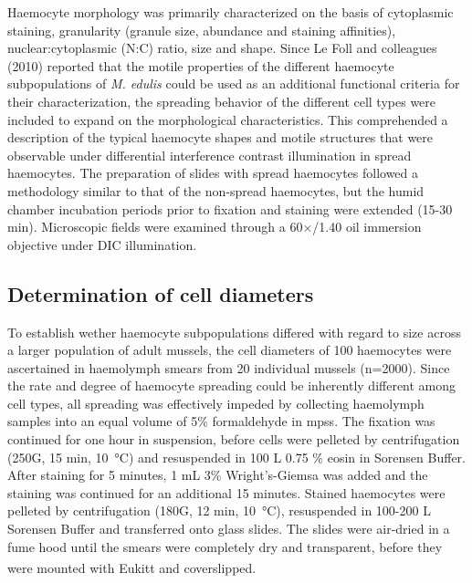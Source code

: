 Haemocyte morphology was primarily characterized on the basis of cytoplasmic staining, granularity (granule size, abundance and staining affinities), nuclear:cytoplasmic (N:C) ratio, size and shape. Since Le Foll and colleagues (2010) reported that the motile properties of the different haemocyte subpopulations of \emph{M. edulis} could be used as an additional functional criteria for their characterization, the spreading behavior of the different cell types were included to expand on the morphological characteristics. This comprehended a description of the typical haemocyte shapes and motile structures that were observable under differential interference contrast illumination in spread haemocytes. The preparation of slides with spread haemocytes followed a methodology similar to that of the non-spread haemocytes, but the humid chamber incubation periods prior to fixation and staining were extended (15-30 min). Microscopic fields were examined through a 60$\times$/1.40 oil immersion objective under DIC illumination.

\subsection{Determination of cell diameters}
\label{subsection:CytCar}
To establish wether haemocyte subpopulations differed with regard to size across a larger population of adult mussels, the cell diameters of 100 haemocytes were ascertained in haemolymph smears from 20 individual mussels (n=2000). Since the rate and degree of haemocyte spreading could be inherently different among cell types, all spreading was effectively impeded by collecting haemolymph samples into an equal volume of 5\% formaldehyde in \acrshort{mpss}. The fixation was continued for one hour in suspension, before cells were pelleted by centrifugation (250G, 15 min, \SI{10}{\celsius}) and resuspended in 100 \micro L 0.75 \% eosin in Sorensen Buffer. After staining for 5 minutes, 1 mL 3\% Wright’s-Giemsa was added and the staining was continued for an additional 15 minutes. Stained haemocytes were pelleted by centrifugation (180G, 12 min, \SI{10}{\celsius}), resuspended in 100-200 \micro L Sorensen Buffer and transferred onto glass slides. The slides were air-dried in a fume hood until the smears were completely dry and transparent, before they were mounted with Eukitt\textsuperscript{\textregistered} and coverslipped.


